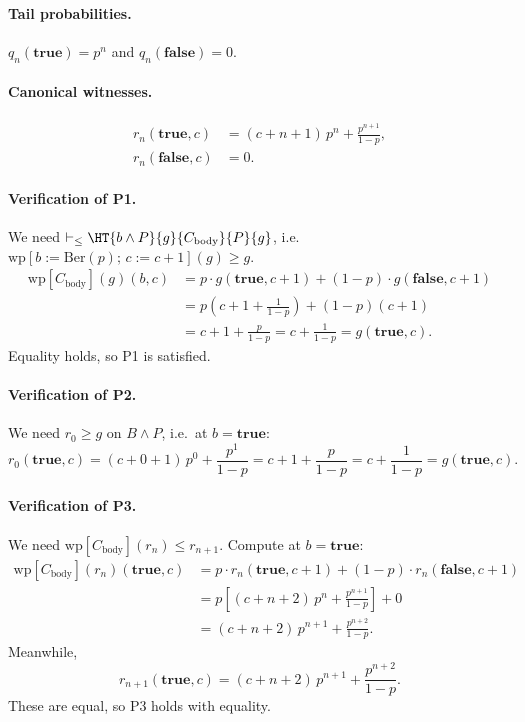 \documentclass[acmsmall,natbib,review,screen,anonymous,10pt]{acmart}
\begin{document}
\paragraph{Tail probabilities.}
$q_n(\mathbf{true}) = p^n$ and $q_n(\mathbf{false}) = 0$.

\paragraph{Canonical witnesses.}
\begin{align*}
  r_n(\mathbf{true},c) &= (c+n+1)\,p^n + \frac{p^{n+1}}{1-p}, \\
  r_n(\mathbf{false},c) &= 0.
\end{align*}

\paragraph{Verification of P1.}
We need $\vdash_{\leq}\HT{b\land P}{g}{C_{\text{body}}}{P}{g}$, i.e.\
$\mathrm{wp}[b\mathrel{:=}\mathrm{Ber}(p);\,c\mathrel{:=}c+1](g) \geq g$.
\begin{align*}
  \mathrm{wp}[C_{\text{body}}](g)(b,c)
    &= p\cdot g(\mathbf{true},c+1) + (1-p)\cdot g(\mathbf{false},c+1) \\
    &= p\!\left(c+1+\tfrac{1}{1-p}\right) + (1-p)(c+1) \\
    &= c + 1 + \tfrac{p}{1-p}
     = c + \tfrac{1}{1-p}
     = g(\mathbf{true},c).
\end{align*}
Equality holds, so P1 is satisfied.

\paragraph{Verification of P2.}
We need $r_0 \geq g$ on $B\land P$, i.e.\ at $b=\mathbf{true}$:
\[
  r_0(\mathbf{true},c)
  = (c+0+1)\,p^0 + \frac{p^1}{1-p}
  = c + 1 + \frac{p}{1-p}
  = c + \frac{1}{1-p}
  = g(\mathbf{true},c).
\]

\paragraph{Verification of P3.}
We need $\mathrm{wp}[C_{\text{body}}](r_n) \leq r_{n+1}$. Compute at $b=\mathbf{true}$:
\begin{align*}
  \mathrm{wp}[C_{\text{body}}](r_n)(\mathbf{true},c)
    &= p\cdot r_n(\mathbf{true},c+1) + (1-p)\cdot r_n(\mathbf{false},c+1) \\
    &= p\!\left[(c+n+2)\,p^n + \frac{p^{n+1}}{1-p}\right] + 0 \\
    &= (c+n+2)\,p^{n+1} + \frac{p^{n+2}}{1-p}.
\end{align*}
Meanwhile,
\[
  r_{n+1}(\mathbf{true},c)
  = (c+n+2)\,p^{n+1} + \frac{p^{n+2}}{1-p}.
\]
These are equal, so P3 holds with equality.
\end{document}
